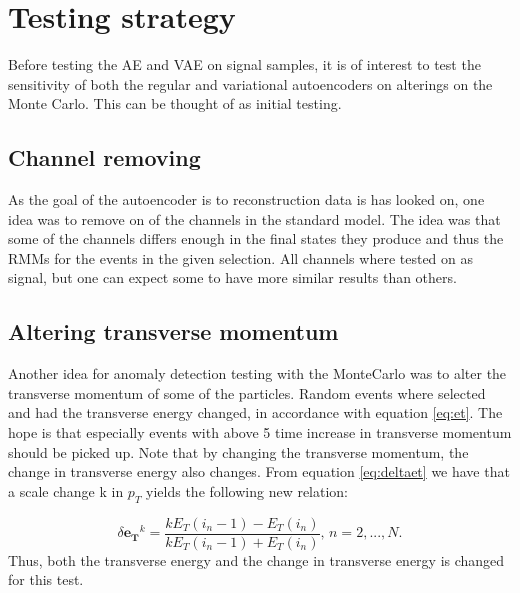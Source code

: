 \section*{Testing strategy}

Before testing the AE and VAE on signal samples, it is of interest to test the sensitivity of both the regular and variational autoencoders 
on alterings on the Monte Carlo. This can be thought of as initial testing. 
\subsection*{Channel removing}
As the goal of the autoencoder is to reconstruction data is has looked on, one idea was to remove on of the channels in the standard model.
The idea was that some of the channels differs enough in the final states they produce and thus the RMMs for the events in the given selection. 
All channels where tested on as signal, but one can expect some to have more similar results than others. 

\subsection*{Altering transverse momentum}
Another idea for anomaly detection testing with the MonteCarlo was to alter the transverse momentum of some of the particles. Random events where
selected and had the transverse energy changed, in accordance with equation \ref{eq:et}. The hope is that especially events with above 5 time 
increase in transverse momentum should be picked up. Note that by changing the transverse momentum, the change in transverse energy also changes. 
From equation \ref{eq:deltaet} we have that a scale change k in $p_T$ yields the following new relation:

\begin{equation}\label{eq:deltaet_scale}
    \delta\boldsymbol{e_T}^k = \frac{kE_T(i_n-1) - E_T(i_n)}{kE_T(i_n-1) + E_T(i_n)}, \, n = 2, ..., N.
\end{equation}
Thus, both the transverse energy and the change in transverse energy is changed for this test.


